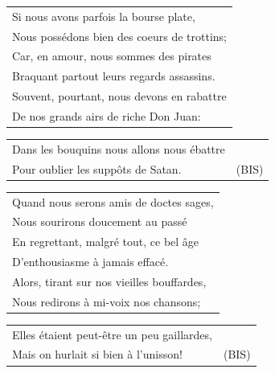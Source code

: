 \documentclass[a4paper, 14pt]{extarticle}
\begin{document}
\begin{flushleft}
\begin{tabularx}{\textwidth} {
    >{\raggedright\arraybackslash}X}
Si nous avons parfois la bourse plate,\\
Nous possédons bien des coeurs de trottins;\\
Car, en amour, nous sommes des pirates\\
Braquant partout leurs regards assassins.\\
Souvent, pourtant, nous devons en rabattre\\
De nos grands airs de riche Don Juan:\\
\end{tabularx}
\begin{tabularx}{\textwidth} {
    >{\raggedright\arraybackslash}X|c}
Dans les bouquins nous allons nous ébattre & \\
Pour oublier les suppôts de Satan. & (BIS)\\
\end{tabularx}
\end{flushleft}
\begin{flushleft}
\begin{tabularx}{\textwidth} {
    >{\raggedright\arraybackslash}X}
Quand nous serons amis de doctes sages,\\
Nous sourirons doucement au passé\\
En regrettant, malgré tout, ce bel âge\\
D’enthousiasme à jamais effacé.\\
Alors, tirant sur nos vieilles bouffardes,\\
Nous redirons à mi-voix nos chansons;\\
\end{tabularx}
\begin{tabularx}{\textwidth} {
    >{\raggedright\arraybackslash}X|c}
Elles étaient peut-être un peu gaillardes, & \\
Mais on hurlait si bien à l’unisson! & (BIS)\\
\end{tabularx}
\end{flushleft}
\end{document}
